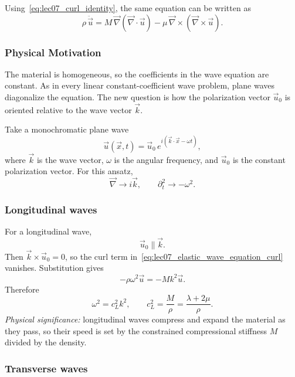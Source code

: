 \documentclass[../main.tex]{subfiles}
\begin{document}
Using~\eqref{eq:lec07_curl_identity}, the same equation can be written as
\begin{equation}
    \rho\,\ddot{\vec{u}}
    =M\,\vec{\nabla}(\vec{\nabla}\cdot\vec{u})
     -\mu\,\vec{\nabla}\times(\vec{\nabla}\times\vec{u}).
    \label{eq:lec07_elastic_wave_equation_curl}
\end{equation}

\subsubsection*{Physical Motivation}
The material is homogeneous, so the coefficients in the wave equation are constant. As in every linear constant-coefficient wave problem, plane waves diagonalize the equation. The new question is how the polarization vector $\vec{u}_0$ is oriented relative to the wave vector $\vec{k}$.

Take a monochromatic plane wave
\begin{equation}
    \vec{u}(\vec{x},t)
    =\vec{u}_0\,e^{i(\vec{k}\cdot\vec{x}-\omega t)},
    \label{eq:lec07_plane_wave_ansatz}
\end{equation}
where $\vec{k}$ is the wave vector, $\omega$ is the angular frequency, and $\vec{u}_0$ is the constant polarization vector. For this ansatz,
\[
    \vec{\nabla}\to i\vec{k},
    \qquad
    \partial_t^2\to -\omega^2.
\]

\subsubsection*{Longitudinal waves}

For a longitudinal wave,
\begin{equation}
    \vec{u}_0\parallel\vec{k}.
    \label{eq:lec07_longitudinal_polarization}
\end{equation}
Then $\vec{k}\times\vec{u}_0=0$, so the curl term in~\eqref{eq:lec07_elastic_wave_equation_curl} vanishes. Substitution gives
\[
    -\rho\omega^2\vec{u}
    = -M k^2\vec{u}.
\]
Therefore
\begin{equation}
    \boxed{
    \omega^2=c_L^2k^2,
    \qquad
    c_L^2=\frac{M}{\rho}
    =\frac{\lambda+2\mu}{\rho}.}
    \label{eq:lec07_longitudinal_speed}
\end{equation}
\textit{Physical significance:} longitudinal waves compress and expand the material as they pass, so their speed is set by the constrained compressional stiffness $M$ divided by the density.

\subsubsection*{Transverse waves}
\end{document}
